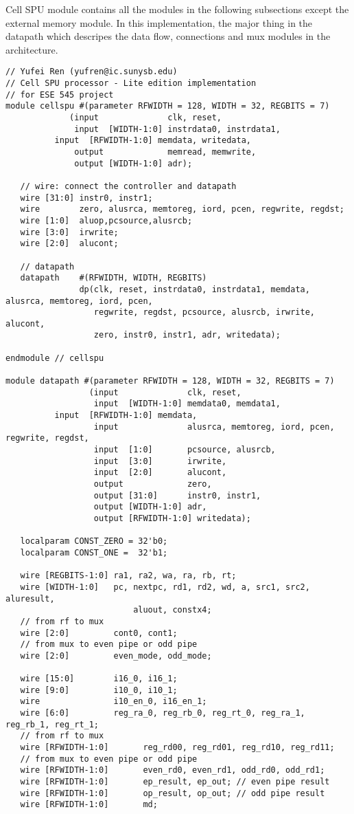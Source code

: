 \documentclass[preprint,authoryear,12pt]{elsarticle}
\begin{document}
Cell SPU module contains all the modules in the following subsections
except the external memory module. In this implementation, the major
thing in the datapath which descripes the data flow, connections and
mux modules in the architecture.


\begin{verbatim}
// Yufei Ren (yufren@ic.sunysb.edu)
// Cell SPU processor - Lite edition implementation
// for ESE 545 project
module cellspu #(parameter RFWIDTH = 128, WIDTH = 32, REGBITS = 7)
             (input              clk, reset,
              input  [WIDTH-1:0] instrdata0, instrdata1,
	      input  [RFWIDTH-1:0] memdata, writedata,
              output             memread, memwrite, 
              output [WIDTH-1:0] adr);

   // wire: connect the controller and datapath
   wire [31:0] instr0, instr1;
   wire        zero, alusrca, memtoreg, iord, pcen, regwrite, regdst;
   wire [1:0]  aluop,pcsource,alusrcb;
   wire [3:0]  irwrite;
   wire [2:0]  alucont;

   // datapath
   datapath    #(RFWIDTH, WIDTH, REGBITS)
               dp(clk, reset, instrdata0, instrdata1, memdata, alusrca, memtoreg, iord, pcen,
                  regwrite, regdst, pcsource, alusrcb, irwrite, alucont,
                  zero, instr0, instr1, adr, writedata);

endmodule // cellspu

module datapath #(parameter RFWIDTH = 128, WIDTH = 32, REGBITS = 7)
                 (input              clk, reset, 
                  input  [WIDTH-1:0] memdata0, memdata1,
		  input  [RFWIDTH-1:0] memdata,
                  input              alusrca, memtoreg, iord, pcen, regwrite, regdst,
                  input  [1:0]       pcsource, alusrcb, 
                  input  [3:0]       irwrite, 
                  input  [2:0]       alucont, 
                  output             zero, 
                  output [31:0]      instr0, instr1,
                  output [WIDTH-1:0] adr,
                  output [RFWIDTH-1:0] writedata);

   localparam CONST_ZERO = 32'b0;
   localparam CONST_ONE =  32'b1;

   wire [REGBITS-1:0] ra1, ra2, wa, ra, rb, rt;
   wire [WIDTH-1:0]   pc, nextpc, rd1, rd2, wd, a, src1, src2, aluresult,
                          aluout, constx4;
   // from rf to mux
   wire [2:0] 	      cont0, cont1;
   // from mux to even pipe or odd pipe
   wire [2:0] 	      even_mode, odd_mode;
   
   wire [15:0] 	      i16_0, i16_1;
   wire [9:0] 	      i10_0, i10_1;
   wire               i10_en_0, i16_en_1;
   wire [6:0]         reg_ra_0, reg_rb_0, reg_rt_0, reg_ra_1, reg_rb_1, reg_rt_1;
   // from rf to mux
   wire [RFWIDTH-1:0]       reg_rd00, reg_rd01, reg_rd10, reg_rd11;
   // from mux to even pipe or odd pipe
   wire [RFWIDTH-1:0]       even_rd0, even_rd1, odd_rd0, odd_rd1;
   wire [RFWIDTH-1:0]       ep_result, ep_out; // even pipe result
   wire [RFWIDTH-1:0] 	    op_result, op_out; // odd pipe result
   wire [RFWIDTH-1:0] 	    md;


\end{verbatim}
\end{document}
